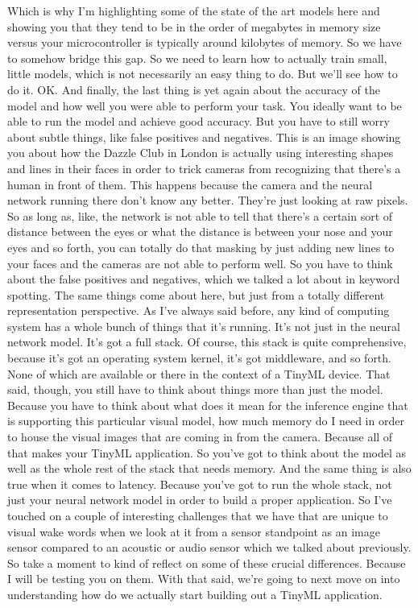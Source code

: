   Which is why I'm highlighting some of the state of the art models
  here and showing you that they tend to be in the order of megabytes
  in memory size versus your microcontroller
  is typically around kilobytes of memory.
  So we have to somehow bridge this gap.
  So we need to learn how to actually train small, little models, which
  is not necessarily an easy thing to do.
  But we'll see how to do it.
  OK.
  And finally, the last thing is yet again about the accuracy of the model
  and how well you were able to perform your task.
  You ideally want to be able to run the model and achieve good accuracy.
  But you have to still worry about subtle things,
  like false positives and negatives.
  This is an image showing you about how the Dazzle Club in London
  is actually using interesting shapes and lines in their faces
  in order to trick cameras from recognizing
  that there's a human in front of them.
  This happens because the camera and the neural network
  running there don't know any better.
  They're just looking at raw pixels.
  So as long as, like, the network is not able to tell
  that there's a certain sort of distance between the eyes
  or what the distance is between your nose and your eyes and so forth,
  you can totally do that masking by just adding
  new lines to your faces and the cameras are not able to perform well.
  So you have to think about the false positives and negatives, which we
  talked a lot about in keyword spotting.
  The same things come about here, but just
  from a totally different representation perspective.
  As I've always said before, any kind of computing system
  has a whole bunch of things that it's running.
  It's not just in the neural network model.
  It's got a full stack.
  Of course, this stack is quite comprehensive,
  because it's got an operating system kernel, it's got middleware,
  and so forth.
  None of which are available or there in the context of a TinyML device.
  That said, though, you still have to think
  about things more than just the model.
  Because you have to think about what does it
  mean for the inference engine that is supporting
  this particular visual model, how much memory do
  I need in order to house the visual images that
  are coming in from the camera.
  Because all of that makes your TinyML application.
  So you've got to think about the model as well as the whole rest
  of the stack that needs memory.
  And the same thing is also true when it comes to latency.
  Because you've got to run the whole stack, not just your neural network
  model in order to build a proper application.
  So I've touched on a couple of interesting challenges
  that we have that are unique to visual wake words when
  we look at it from a sensor standpoint as an image sensor compared
  to an acoustic or audio sensor which we talked about previously.
  So take a moment to kind of reflect on some of these crucial differences.
  Because I will be testing you on them.
  With that said, we're going to next move on
  into understanding how do we actually start
  building out a TinyML application.
  
